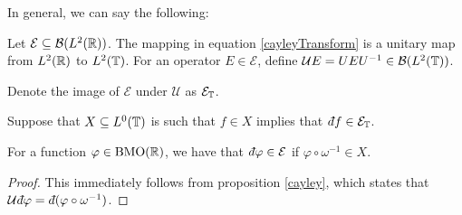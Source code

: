 In general, we can say the following:
\begin{proposition}
    Let $\mathcal{E} \subseteq \mathcal{B}(L^2(\mathbb{R}))$. 
    The mapping in equation \ref{cayleyTransform} is a unitary
    map from $L^2(\mathbb{R})$ to $L^2(\mathbb{T})$. For an operator
    $E \in \mathcal{E}$, define $\mathcal{U}E = UEU^{-1} \in \mathcal{B}(L^2(\mathbb{T}))$.
    
    Denote the image of $\mathcal{E}$ under $\mathcal{U}$ as $\mathcal{E}_{\mathbb{T}}$.
    
    Suppose that $X \subseteq L^0(\mathbb{T})$ is such that $f \in X$
    implies that $\qd f \in \mathcal{E}_\Circ$.
    
    For a function
    $\varphi \in \operatorname{BMO}(\mathbb{R})$, we have that $\qd \varphi \in \mathcal{E}$
    if $\varphi\circ \omega^{-1} \in X$.
\end{proposition}
\begin{proof}
    This immediately follows from proposition \ref{cayley}, which states
    that $\mathcal{U}\qd \varphi = \qd (\varphi \circ \omega^{-1})$.
\end{proof}



